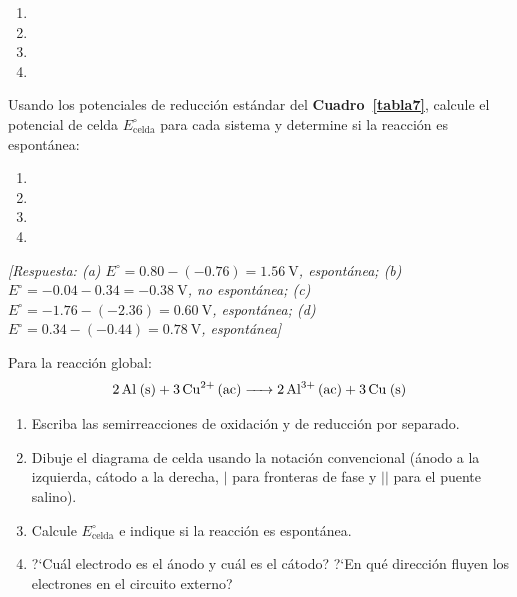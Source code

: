 \begin{bloque_ejercicios}
\begin{ejercicios}
\begin{enumerate}[label=\alph*)]
    \item {}
    \item {}
    \item {}
    \item {}
\end{enumerate}

\item Usando los potenciales de reducci\'on est\'andar del
\textbf{Cuadro~\ref{tabla7}}, calcule el potencial de celda $E^\circ_{\text{celda}}$
para cada sistema y determine si la reacci\'on es espont\'anea:

\begin{enumerate}[label=\alph*)]
    \item {}
    \item {}
    \item {}
    \item {}
\end{enumerate}

\textit{[Respuesta:
(a) $E^\circ = 0.80 - (-0.76) = \SI{1.56}{\volt}$, espont\'anea;
(b) $E^\circ = -0.04 - 0.34 = \SI{-0.38}{\volt}$, no espont\'anea;
(c) $E^\circ = -1.76 - (-2.36) = \SI{0.60}{\volt}$, espont\'anea;
(d) $E^\circ = 0.34 - (-0.44) = \SI{0.78}{\volt}$, espont\'anea]}

\item Para la reacci\'on global:
\[
    \ce{2Al (s) + 3Cu^2+ (ac) -> 2Al^3+ (ac) + 3Cu (s)}
\]

\begin{enumerate}[label=\alph*)]
    \item Escriba las semirreacciones de oxidaci\'on y de reducci\'on
          por separado.
    \item Dibuje el diagrama de celda usando la notaci\'on convencional
          (\'anodo a la izquierda, c\'atodo a la derecha, $|$ para fronteras
          de fase y $||$ para el puente salino).
    \item Calcule $E^\circ_{\text{celda}}$ e indique si la reacci\'on
          es espont\'anea.
    \item ?`Cu\'al electrodo es el \'anodo y cu\'al es el c\'atodo?
          ?`En qu\'e direcci\'on fluyen los electrones en el circuito externo?
\end{enumerate}


\end{ejercicios}
\end{bloque_ejercicios}
